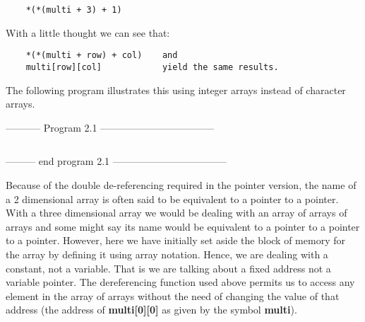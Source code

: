 \begin{verbatim}
    *(*(multi + 3) + 1)
\end{verbatim}

With a little thought we can see that:

\begin{verbatim}
    *(*(multi + row) + col)    and
    multi[row][col]            yield the same results.
\end{verbatim}

The following program illustrates this using integer arrays instead of
character arrays.

-----------  Program 2.1  -----------------------------------
\inputminted{c}{../src/ch2-1.c}
--------- end program 2.1 -----------------------------------

Because of the double de-referencing required in the pointer version,
the name of a 2 dimensional array is often said to be equivalent to a
pointer to a pointer. With a three dimensional array we would be dealing
with an array of arrays of arrays and some might say its name would be
equivalent to a pointer to a pointer to a pointer. However, here we have
initially set aside the block of memory for the array by defining it
using array notation. Hence, we are dealing with a constant, not a
variable. That is we are talking about a fixed address not a variable
pointer. The dereferencing function used above permits us to access any
element in the array of arrays without the need of changing the value of
that address (the address of \textbf{multi{[}0{]}{[}0{]}} as given by
the symbol \textbf{multi}).

\begin{comment}
\href{ch7x.htm}{Chapter 7: More on Multi-Dimensional Arrays}

\href{pointers.htm}{Back to Table of Contents}
\end{comment}
